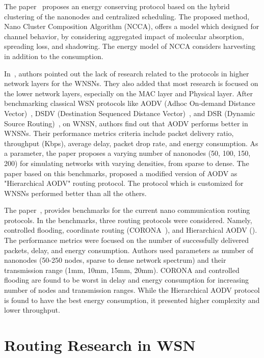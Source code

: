 \documentclass[12pt, oneandhalf, chaparabic, sees, ms]{metu}
\begin{document}
The paper~\cite{afsana2018} proposes an energy conserving protocol based on the hybrid clustering of the nanonodes and centralized scheduling.
The proposed method, Nano Cluster Composition Algorithm (NCCA), offers a model which designed for channel behavior, by considering 
aggregated impact of molecular absorption, spreading loss, and shadowing. The energy model of NCCA considers harvesting in addition to the consumption.


In~\cite{tairin2017}, authors pointed out the lack of research related to the protocols in higher network layers for the WNSNs. 
They also added that most research is focused on the lower network layers, especially on the MAC layer and Physical layer. 
After benchmarking classical WSN protocols like AODV (Adhoc On-demand Distance Vector)~\cite{RFC3561, jhaveri2015, hofner2012}, DSDV (Destination Sequenced Distance Vector)~\cite{perkins1994}, 
and DSR (Dynamic Source Routing)~\cite{johnson2001}, on WNSN, authors find out that AODV performs better in WNSNs. Their performance metrics criteria include packet delivery ratio, 
throughput (Kbps), average delay, packet drop rate, and energy consumption. As a parameter, the paper proposes a varying number of nanonodes (50, 100, 150, 200) for 
simulating networks with varying densities, from sparse to dense.
The paper based on this benchmarks, proposed a modified version of AODV as "Hierarchical AODV" routing protocol. The protocol which is customized for 
WNSNs performed better than all the others.


The paper~\cite{abuali2018}, provides benchmarks for the current nano communication routing protocols.
In the benchmarks, three routing protocols were considered. Namely, controlled flooding, coordinate routing (CORONA~\cite{liaskos2015}),
and Hierarchical AODV (\cite{tairin2017}). The performance metrics were focused on the number of successfully delivered packets, delay, and energy consumption. 
Authors used parameters as number of nanonodes (50-250 nodes, sparse to dense network spectrum) and their transmission range (1mm, 10mm, 15mm, 20mm). 
CORONA and controlled flooding are found to be worst in delay and energy
consumption for increasing number of nodes and transmission ranges. While the Hierarchical AODV protocol is found to have the best energy consumption, 
it presented higher complexity and lower throughput. 






\newpage
\section{Routing Research in WSN}\label{sroutingWSN}
\end{document}

